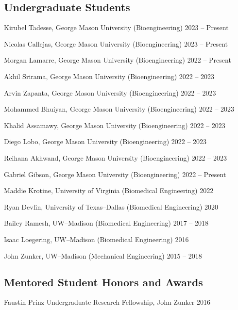 \documentclass[letterpaper, 10pt]{article}
\begin{document}
\subsection{\textbf{Undergraduate Students}}
\begin{compacthang}
	\item Kirubel Tadesse, George Mason University (Bioengineering) \hfill 2023 -- Present
	\item Nicolas Callejas, George Mason University (Bioengineering) \hfill 2023 -- Present
	\item Morgan Lamarre, George Mason University (Bioengineering) \hfill 2022 -- Present
	\item Akhil Srirama, George Mason University (Bioengineering)  \hfill 2022 -- 2023
	\item Arvin Zapanta, George Mason University (Bioengineering)  \hfill 2022 -- 2023
	\item Mohammed Bhuiyan, George Mason University (Bioengineering)  \hfill 2022 -- 2023
	\item Khalid Assamawy, George Mason University (Bioengineering)  \hfill 2022 -- 2023
	\item Diego Lobo, George Mason University (Bioengineering)  \hfill 2022 -- 2023
     \item Reihana Akhwand, George Mason University (Bioengineering) \hfill 2022 -- 2023
	\item Gabriel Gibson, George Mason University (Bioengineering) \hfill 2022 -- Present
	\item Maddie Krotine, University of Virginia (Biomedical Engineering) \hfill 2022
	\item Ryan Devlin, University of Texas--Dallas (Biomedical Engineering) \hfill 2020
	\item Bailey Ramesh, UW--Madison (Biomedical Engineering) \hfill 2017 -- 2018
	\item Isaac Loegering, UW--Madison (Biomedical Engineering) \hfill 2016
	\item John Zunker, UW--Madison (Mechanical Engineering) \hfill 2015 -- 2018
\end{compacthang}

\subsection{\textbf{Mentored Student Honors and Awards}}
\begin{compacthang}
	\item Faustin Prinz Undergraduate Research Fellowship, John Zunker \hfill 2016
\end{compacthang}
\end{document}
